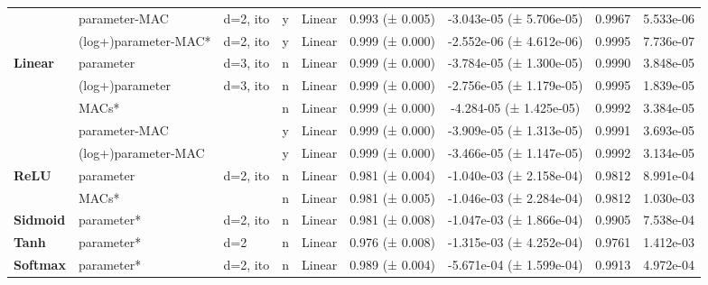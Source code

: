 \begin{table}[h]
{\begin{tabular}{lllcccccc}
                                & parameter-MAC        & d=2, ito & y & Linear & 0.993 (± 0.005) & -3.043e-05 (± 5.706e-05) & 0.9967 & 5.533e-06  \\
                                & (log+)parameter-MAC*  & d=2, ito & y & Linear & 0.999 (± 0.000) & -2.552e-06 (± 4.612e-06) & 0.9995 & 7.736e-07  \\
            \textbf{Linear}     & parameter             & d=3, ito &n& Linear & 0.999 (± 0.000) & -3.784e-05 (± 1.300e-05) & 0.9990 & 3.848e-05  \\
                                & (log+)parameter       & d=3, ito &n& Linear & 0.999 (± 0.000) & -2.756e-05 (± 1.179e-05) & 0.9995 & 1.839e-05  \\
                                & MACs*                  &&n& Linear & 0.999 (± 0.000) & -4.284-05 (± 1.425e-05) & 0.9992 & 3.384e-05  \\
                                & parameter-MAC        &&y& Linear & 0.999 (± 0.000) & -3.909e-05 (± 1.313e-05) & 0.9991 & 3.693e-05  \\
                                & (log+)parameter-MAC  &&y& Linear & 0.999 (± 0.000) & -3.466e-05 (± 1.147e-05) & 0.9992 & 3.134e-05  \\
            \textbf{ReLU}       & parameter             & d=2, ito & n & Linear & 0.981 (± 0.004) & -1.040e-03 (± 2.158e-04) & 0.9812 & 8.991e-04  \\
                                & MACs*                 & & n & Linear & 0.981 (± 0.005) & -1.046e-03 (± 2.284e-04) & 0.9812 & 1.030e-03  \\
            \textbf{Sidmoid}       & parameter*             & d=2, ito & n & Linear & 0.981 (± 0.008) & -1.047e-03 (± 1.866e-04) & 0.9905 & 7.538e-04  \\
            \textbf{Tanh}       & parameter*             & d=2 & n & Linear & 0.976 (± 0.008) & -1.315e-03 (± 4.252e-04) & 0.9761 & 1.412e-03  \\
            \textbf{Softmax}       & parameter*             & d=2, ito & n & Linear & 0.989 (± 0.004) & -5.671e-04 (± 1.599e-04) & 0.9913 & 4.972e-04  \\
                                
    \end{tabular}
    }
\end{table}
